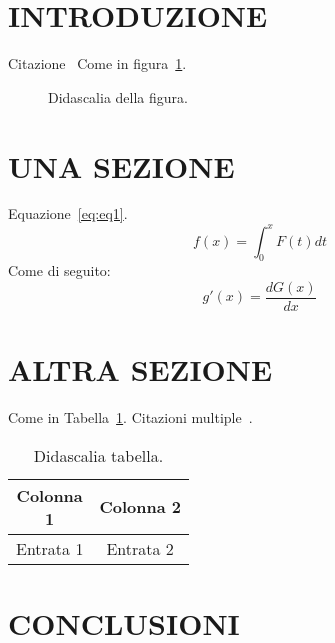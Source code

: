 \documentclass[11pt]{aiasaward}
\affiliation{\textsuperscript{a}Affiliazione A, \textsuperscript{b}Affiliazione B}
\begin{document}
	\maketitle
	\section{INTRODUZIONE}
		\lipsum[1] Citazione~\cite{dummy_paper} Come in figura~\ref{fig:fig1}.
		\begin{figure}[h!]
			\centering
			\caption{Didascalia della figura.}
			\label{fig:fig1}
		\end{figure}
		
	\section{UNA SEZIONE}
		\lipsum[2] Equazione~\ref{eq:eq1}.
		\begin{equation}
			f(x) = \int_{0}^{x} F(t) dt
			\label{eq:eq1}
		\end{equation}
		Come di seguito:
		\begin{equation*}
			g'(x) = \frac{dG(x)}{dx}
		\end{equation*}
		
	\section{ALTRA SEZIONE}
		\lipsum[3] Come in Tabella~\ref{tab:tab1}. Citazioni multiple~\cite{dummy_paper1, dummy_paper2, dummy_paper3}.
		\begin{table}[h!]
			\centering
			\caption{Didascalia tabella.}
			\begin{tabular}{cc}
				\toprule
				\makecell[t]{Colonna\\ 1}  & Colonna 2\\
				\midrule
				Entrata 1 & Entrata 2\\
				\bottomrule
			\end{tabular}   
			\label{tab:tab1}
		\end{table}

	\section{CONCLUSIONI}
		\lipsum[4]

\renewcommand*{\bibfont}{\footnotesize} %
\printbibliography[title=BIBLIOGRAFIA]
\end{document}
